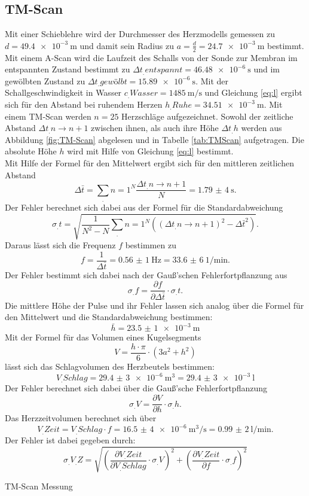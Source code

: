 \subsection{TM-Scan}
Mit einer Schieblehre wird der Durchmesser des Herzmodells gemessen zu $d=\SI{49,4e-3}{\metre}$ und damit sein Radius zu $a=\frac{d}{2}=\SI{24,7e-3}{\metre}$ bestimmt.
Mit einem A-Scan wird die Laufzeit des Schalls von der Sonde zur Membran im entspannten Zustand bestimmt zu $\Delta t_.{entspannt}= \SI{46,48e-6}{\second}$ und im gewölbten Zustand zu $\Delta t_.{gewölbt}= \SI{15,89e-6}{\second}$.\newline
Mit der Schallgeschwindigkeit in Wasser $c_.{Wasser}=\SI{1485}{\metre\per\second}$ und Gleichung \eqref{eq:l} ergibt sich für den Abstand bei ruhendem Herzen $h_.{Ruhe} = \SI{34,51e-3}{\metre}$.
Mit einem TM-Scan werden $n=25$ Herzschläge aufgezeichnet. Sowohl der zeitliche Abstand $\Delta t_.{n\rightarrow n+1}$ zwischen ihnen, als auch ihre Höhe $\Delta t_.h$ werden aus Abbildung \ref{fig:TM-Scan} abgelesen und in Tabelle \ref{tab:TMScan} aufgetragen.
Die absolute Höhe $h$ wird mit Hilfe von Gleichung \ref{eq:l} bestimmt.\\
Mit Hilfe der Formel für den Mittelwert ergibt sich für den mittleren zeitlichen Abstand
\[
\Delta\bar{t}= \sum_.{n=1}^N \frac{\Delta t_.{n\rightarrow n+1}}{N} = \SI{1,79(4)}{\second} \text{.}
\]
Der Fehler berechnet sich dabei aus der Formel für die Standardabweichung
\[
\sigma_.t=\sqrt{\frac{1}{N^2-N}\sum_.n=1^N ((\Delta t_.{n\rightarrow n+1})^2-\Delta\bar{t}^2)} \text{.}
\]
Daraus lässt sich die Frequenz $f$ bestimmen zu
\[
f=\frac{1}{\Delta\bar{t}}= \SI{0,56(1)}{\hertz}=\SI{33,6(6)}{1\per\minute} \text{.}
\]
Der Fehler bestimmt sich dabei nach der Gauß'schen Fehlerfortpflanzung aus
\[
\sigma_.f=\frac{\partial f}{\partial \Delta\bar{t}}\cdot \sigma_.t \text{.}
\]
Die mittlere Höhe der Pulse und ihr Fehler lassen sich analog über die Formel für den Mittelwert und die Standardabweichung bestimmen:
\[
\bar{h}=\SI{23,5(1)e-3}{\metre}
\]
Mit der Formel für das Volumen eines Kugelsegments
\[
V=\frac{h\cdot\pi}{6}\cdot\left(3a^2+h^2\right)
\]
lässt sich das Schlagvolumen des Herzbeutels bestimmen:
\[
V_.{Schlag}=\SI{29,4(3)e-6}{\cubic\metre}=\SI{29,4(3)e-3}{\litre}
\]
Der Fehler berechnet sich dabei über die Gauß'sche Fehlerfortpflanzung
\[
\sigma_.V=\frac{\partial V}{\partial h}\cdot\sigma_.h \text{.}
\]
Das Herzzeitvolumen berechnet sich über
\[
V_.{Zeit} = V_.{Schlag} \cdot f =\SI{16,5(4)e-6}{\cubic\metre\per\second} = \SI{0,99(2)}{\litre\per\minute}\text{.}
\]
Der Fehler ist dabei gegeben durch:
\[
\sigma_.{V_.Z}= \sqrt{\left(\frac{\partial V_.{Zeit}}{\partial V_.{Schlag}}\cdot \sigma_.V\right)^2+\left(\frac{\partial V_.{Zeit}}{\partial f}\cdot \sigma_.f\right)^2}
\]
\begin{table}
	\centering
	\caption{TM-Scan Messung}
	
	\label{tab:TMScan}
\end{table}

